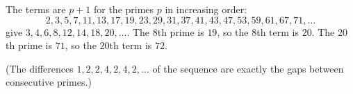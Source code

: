The terms are $p+1$ for the primes $p$ in increasing order:
\[
2,3,5,7,11,13,17,19,23,29,31,37,41,43,47,53,59,61,67,71,\dots
\]
give $3,4,6,8,12,14,18,20,\dots$. The $8$th prime is $19$, so the $8$th term is $\boxed{20}$. The $20$th prime is $71$, so the $20$th term is $\boxed{72}$.

(The differences $1,2,2,4,2,4,2,\dots$ of the sequence are exactly the gaps between consecutive primes.)
